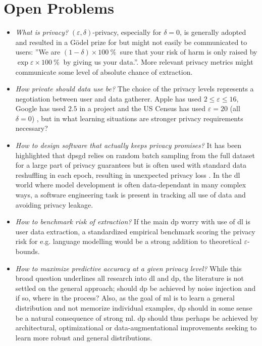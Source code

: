 \documentclass[12pt,fleqn,twocolumn]{article}
\newcommand{\pro}{\ensuremath{\:\%{}\:}}
\begin{document}
\section*{Open Problems}%
\label{sec:Open Problems}
\begin{itemize}
    \item \emph{What is privacy?} 
      $(\varepsilon, \delta)$-privacy, especially for $\delta=0$, is generally adopted and resulted in a Gödel prize for \textcite{dwork2006cali} but might not easily be communicated to users: ''We are $(1-\delta)\times 100\pro$ sure that your risk of harm is only raised by $\exp{\varepsilon}\times 100\pro$ by giving us your data.''.
      More relevant privacy metrics might communicate some level of absolute chance of extraction.
    \item \emph{How private should data use be?} 
        The choice of the privacy levels represents a negotiation between user and data gatherer.
        Apple has used $2 \le \varepsilon \le 16$, Google has used $2.5$ in a project and the US Census has used $\varepsilon=20$ (all $\delta=0$) \cite{near2022priv}, but in what learning situations are stronger privacy requirements necessary?
    \item  \emph{How to design software that actually keeps privacy promises?}
        It has been highlighted that \acrshort{dpsgd} relies on random batch sampling from the full dataset for a large part of privacy guarantees but is often used with standard data reshuffling in each epoch, resulting in unexpected privacy loss \cite[Chap. III]{Yu2019DifferentiallyPM}.
        In the \acrshort{dl} world where model development is often data-dependant in many complex ways, a software engineering task is present in tracking all use of data and avoiding privacy leakage.
    \item \emph{How to benchmark risk of extraction?}
        If the main \acrshort{dp} worry with use of \acrshort{dl} is user data extraction, a standardized empirical benchmark scoring the privacy risk for e.g. language modelling would be a strong addition to theoretical $\varepsilon$-bounds.
    \item \emph{How to maximize predictive accuracy at a given privacy level?}
        While this broad question underlines all research into \acrshort{dl} and \acrshort{dp}, the literature is not settled on the general approach; should \acrshort{dp} be achieved by noise injection and if so, where in the process?
        Also, as the goal of \acrshort{ml} is to learn a general distribution and not memorize individual examples, \acrshort{dp} should in some sense be a natural consequence of strong \acrshort{ml}.
        \acrshort{dp} should thus perhaps be achieved by architectural, optimizational or data-augmentational improvements seeking to learn more robust and general distributions.
\end{itemize}
\clearpage
\renewcommand*{\bibfont}{\normalfont\footnotesize}
\printbibliography[heading=bibintoc]

\printglossary[type=\acronymtype]
\end{document}
